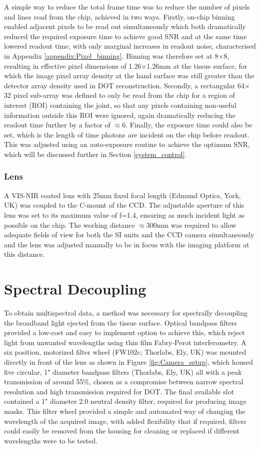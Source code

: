 \documentclass[twoside]{bhamthesis}
\theoremstyle{definition}
\begin{document}
A simple way to reduce the total frame time was to reduce the number of pixels and lines read from the chip, achieved in two ways. Firstly, on-chip binning enabled adjacent pixels to be read out simultaneously which both dramatically reduced the required exposure time to achieve good SNR and at the same time lowered readout time, with only marginal increases in readout noise, characterised in Appendix \ref{appendix:Pixel_binning}. Binning was therefore set at 8$\times$8, resulting in effective pixel dimensions of 1.26$\times$1.26mm at the tissue surface, for which the image pixel array density at the hand surface was still greater than the detector array density used in DOT reconstruction. Secondly, a rectangular 64$\times$32 pixel sub-array was defined to only be read from the chip for a region of interest (ROI) containing the joint, so that any pixels containing non-useful information outside this ROI were ignored, again dramatically reducing the readout time further by a factor of $\approx$6. Finally, the exposure time could also be set, which is the length of time photons are incident on the chip before readout. This was adjusted using an auto-exposure routine to achieve the optimum SNR, which will be discussed further in Section \ref{system_control}.

\subsubsection{Lens}

A VIS-NIR coated lens with 25mm fixed focal length (Edmund Optics, York, UK) was coupled to the C-mount of the CCD. The adjustable aperture of this lens was set to its maximum value of f=1.4, ensuring as much incident light as possible on the chip. The working distance $\approx$300mm was required to allow adequate fields of view for both the SI units and the CCD camera simultaneously and the lens was adjusted manually to be in focus with the imaging platform at this distance.

\section{Spectral Decoupling}

To obtain multispectral data, a method was necessary for spectrally decoupling the broadband light ejected from the tissue surface. Optical bandpass filters provided a low-cost and easy to implement option to achieve this, which reject light from unwanted wavelengths using thin film Fabry-Perot interferometry. A six position, motorized filter wheel (FW102c; Thorlabs, Ely, UK) was mounted directly in front of the lens as shown in Figure \ref{fig:Camera_setup}, which housed five circular, 1" diameter bandpass filters (Thorlabs, Ely, UK) all with a peak transmission of around 55\%, chosen as a compromise between narrow spectral resolution and high transmission required for DOT. The final available slot contained a 1" diameter 2.0 neutral density filter, required for producing image masks. This filter wheel provided a simple and automated way of changing the wavelength of the acquired image, with added flexibility that if required, filters could easily be removed from the housing for cleaning or replaced if different wavelengths were to be tested.
\end{document}

